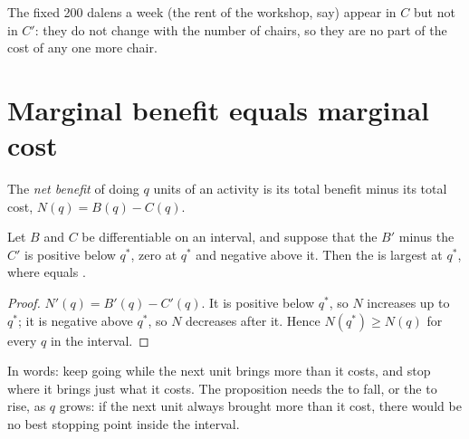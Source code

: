 The fixed 200 dalens a week (the rent of the workshop, say) appear in $C$ but not in $C'$: they do not change with the number of chairs, so they are no part of the
cost of any one more chair.

\section{Marginal benefit equals marginal cost}\label{sec:g11:marginal-reasoning:rule}

\begin{definition}\label{def:g11:marginal-reasoning:net-benefit}
The \emph{net benefit} of doing $q$ units of an activity is its total benefit minus its total cost, $N(q) = B(q) - C(q)$.
\end{definition}

\begin{proposition}\label{prop:g11:marginal-reasoning:rule}
Let $B$ and $C$ be differentiable on an interval, and suppose that the  $B'$ minus the  $C'$ is positive below $q^*$, zero at
$q^*$ and negative above it. Then the  is largest at $q^*$, where  equals .
\end{proposition}
\begin{proof}
$N'(q) = B'(q) - C'(q)$. It is positive below $q^*$, so $N$ increases up to $q^*$; it is negative above $q^*$, so $N$ decreases after it. Hence $N(q^*) \geq N(q)$
for every $q$ in the interval.
\end{proof}

In words: keep going while the next unit brings more than it costs, and stop where it brings just what it costs. The proposition needs the 
to fall, or the  to rise, as $q$ grows: if the next unit always brought more than it cost, there would be no best stopping point inside the interval.

